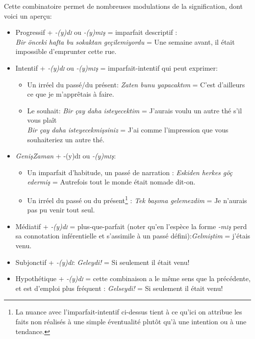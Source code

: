 \documentclass{cours}
\newcommand{\ch}{\c{s}}
\newcommand{\sci}{\textsc{i}}
\begin{document}
Cette combinatoire permet de nombreuses modulations de la signification, dont voici un aperçu:
\begin{itemize}
    \item Progressif + \textsl{-(y)d\sci} ou \textsl{-(y)m\sci \ch} = imparfait descriptif :\\
          \textsl{Bir önceki hafta bu sokaktan geçilemiyordu} = Une semaine avant, il était impossible d'emprunter cette rue.
    \item Intentif + {\sl -(y)d\sci} ou {\sl -(y)m\sci \ch} = imparfait-intentif qui peut exprimer:
          \begin{itemize}
              \item Un irréel du passé/du présent: \textsl{Zaten bunu yapacakt\i m} = C'est d'ailleurs ce que je m'apprêtais à faire.
              \item Le souhait: \textsl{Bir çay daha isteyecektim} = J'aurais voulu un autre thé s'il vous plaît \\
                    \textsl{Bir çay daha isteyecekmi\ch siniz} = J'ai comme l'impression que vous souhaiteriez un autre thé.
          \end{itemize}
    \item \textsl{Geni\ch Zaman} + {-(y)d\sci} ou {\sl -(y)m\sci \ch}:
          \begin{itemize}
              \item Un imparfait d'habitude, un passé de narration : \textsl{Eskiden herkes göç edermi\ch} = Autrefois tout le monde était nomade dit-on.
              \item Un irréel du passé ou du présent\footnote{La nuance avec l'imparfait-intentif ci-dessus tient à ce qu'ici on attribue les faits non réalisés à une simple éventualité plutôt qu'à une intention ou à une tendance.} : \textsl{Tek ba\ch\i ma gelemezdim} = Je n'aurais pas pu venir tout seul.
          \end{itemize}
    \item Médiatif + {\sl -(y)d\sci} = plus-que-parfait (noter qu'en l'espèce la forme \textsl{-m\sci \ch} perd sa connotation inférentielle et s'assimile à un passé défini):\textsl{Gelmi\ch tim} = j'étais venu.
    \item Subjonctif + {\sl -(y)d\sci}: \textsl{Geleydi!} = Si seulement il était venu!
    \item Hypothétique + {\sl -(y)d\sci} = cette combinaison a le même sens que la précédente, et est d'emploi plus fréquent : \textsl{Gelseydi!} = Si seulement il était venu!
\end{itemize}
\end{document}
